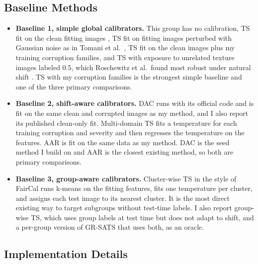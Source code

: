 \documentclass[sigconf,nonacm]{acmart}
\begin{document}
\subsection{Baseline Methods}
\label{sec:baselines}

\begin{itemize}
  \item \textbf{Baseline 1, simple global calibrators.} This group has no calibration, TS fit on the clean fitting images \cite{guo2017calibration}, TS fit on fitting images perturbed with Gaussian noise as in Tomani et al.\ \cite{tomani2021posthoc}, TS fit on the clean images plus my training corruption families, and TS with exposure to unrelated texture images labeled 0.5, which Roschewitz et al.\ found most robust under natural shift \cite{roschewitz2025where}. TS with my corruption families is the strongest simple baseline and one of the three primary comparisons.
  \item \textbf{Baseline 2, shift-aware calibrators.} DAC \cite{tomani2023dac} runs with its official code and is fit on the same clean and corrupted images as my method, and I also report its published clean-only fit. Multi-domain TS \cite{yu2022multidomain} fits a temperature for each training corruption and severity and then regresses the temperature on the features. AAR \cite{yuksekgonul2023atypicality} is fit on the same data as my method. DAC is the seed method I build on and AAR is the closest existing method, so both are primary comparisons.
  \item \textbf{Baseline 3, group-aware calibrators.} Cluster-wise TS in the style of FairCal \cite{salvador2022faircal} runs k-means on the fitting features, fits one temperature per cluster, and assigns each test image to its nearest cluster. It is the most direct existing way to target subgroups without test-time labels. I also report group-wise TS, which uses group labels at test time but does not adapt to shift, and a per-group version of GR-SATS that uses both, as an oracle.
\end{itemize}

\subsection{Implementation Details}
\end{document}
